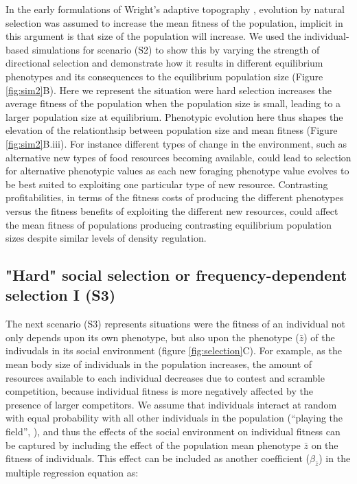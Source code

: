 \documentclass{article}
\begin{document}
In the early formulations of Wright's adaptive topography \citep{Wright1931}, evolution by natural selection was assumed to increase the mean fitness of the population, implicit in this argument is that size of the population will increase. We used the individual-based simulations for scenario (S2) to show this by varying the strength of directional selection and demonstrate how it results in different equilibrium phenotypes and its consequences to the equilibrium population size (Figure \ref{fig:sim2}B). Here we represent the situation were hard selection increases the average fitness of the population when the population size is small, leading to a larger population size at equilibrium. Phenotypic evolution here thus shapes the elevation of the relationthsip between population size and mean fitness (Figure \ref{fig:sim2}B.iii).  For instance different types of change in the environment, such as alternative new types of food resources becoming available, could lead to selection for alternative phenotypic values as each new foraging phenotype value evolves to be best suited to exploiting one particular type of new resource. Contrasting profitabilities, in terms of the fitness costs of producing the different phenotypes versus the fitness benefits of exploiting the different new resources, could affect the mean fitness of populations producing contrasting equilibrium population sizes despite similar levels of density regulation.

 
\subsection{"Hard" social selection or frequency-dependent selection I (S3)}
The next scenario (S3) represents situations were the fitness of an individual not only depends upon its own phenotype, but also upon the phenotype ($\bar{z}$) of the indivudals in its social environment (figure \ref{fig:selection}C). For example, as the mean body size of individuals in the population increases, the amount of resources available to each individual decreases due to contest and scramble competition, because individual fitness is more negatively affected by the presence of larger competitors. We assume that individuals interact at random with equal probability with all other individuals in the population (“playing the field”, \cite{MaynardSmith1982}), and thus the effects of the social environment on individual fitness can be captured by including the effect of the population mean phenotype $\bar{z}$ on the fitness of individuals. This effect can be included as another coefficient ($\beta_{\bar{z}}$) in the multiple regression equation as:  
\end{document}

